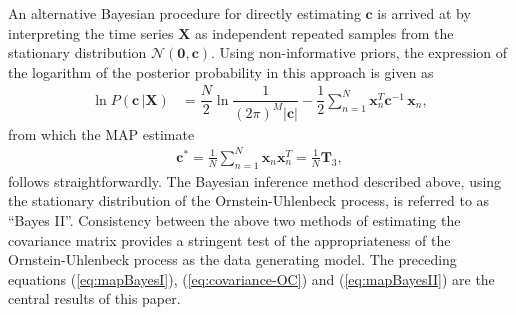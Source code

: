 \documentclass[english,aps, twocolumn, pre,superscriptaddress, notitlepage]{revtex4-1}
\begin{document}
An alternative Bayesian procedure for directly estimating $\boldsymbol{c}$
is arrived at by interpreting the time series $\boldsymbol{X}$ as
independent repeated samples from the stationary distribution $\mathcal{N}\left(\boldsymbol{0},\boldsymbol{c}\right)$.
Using non-informative priors, the expression of the logarithm of the
posterior probability in this approach is given as
\begin{align}
\ln P\left(\boldsymbol{c}\,|\boldsymbol{X}\right) & =\dfrac{N}{2}\ln\dfrac{1}{\left(2\pi\right)^{M}|\bm{c}|}-\dfrac{1}{2}\sum_{n=1}^{N}\boldsymbol{x}_{n}^{T}\boldsymbol{c}^{-1}\,\boldsymbol{x}_{n},\label{eq:posteriorBayesII}
\end{align}
from which the MAP estimate
\begin{align}
\boldsymbol{c}^{\ast}=\frac{1}{N}\sum_{n=1}^{N}\boldsymbol{x}_{n}\boldsymbol{x}_{n}^{T}=\frac{1}{N}\boldsymbol{T}_{3},\label{eq:mapBayesII}
\end{align}
follows straightforwardly. The Bayesian inference method described
above, using the stationary distribution of the Ornstein-Uhlenbeck
process, is referred to as \textquotedblleft Bayes II\textquotedblright .
Consistency between the above two methods of estimating the covariance
matrix provides a stringent test of the appropriateness of the Ornstein-Uhlenbeck
process as the data generating model. The preceding equations (\ref{eq:mapBayesI}),
(\ref{eq:covariance-OC}) and (\ref{eq:mapBayesII}) are the central
results of this paper.
\end{document}
